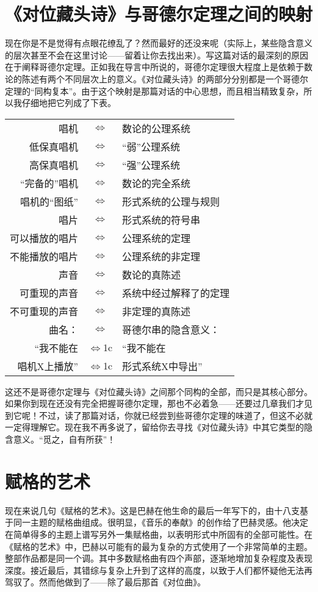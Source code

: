 \section{《对位藏头诗》与哥德尔定理之间的映射}

现在你是不是觉得有点眼花缭乱了？然而最好的还没来呢（实际上，某些隐含意义的层次甚至不会在这里讨论——留着让你去找出来）。写这篇对话的最深刻的原因在于阐释哥德尔定理。正如我在导言中所说的，哥德尔定理很大程度上是依赖于数论的陈述有两个不同层次上的意义。《对位藏头诗》的两部分分别都是一个哥德尔定理的“同构复本”。由于这个映射是那篇对话的中心思想，而且相当精致复杂，所以我仔细地把它列成了下表。

\begin{longtable}[c]{r>{$\iff$}cl}
唱机                & & 数论的公理系统 \\
低保真唱机      & & “弱”公理系统 \\
高保真唱机      & & “强”公理系统 \\
“完备的”唱机  & & 数论的完全系统 \\
唱机的“图纸” & & 形式系统的公理与规则 \\
唱片                 & & 形式系统的符号串 \\
可以播放的唱片 & & 公理系统的定理 \\
不能播放的唱片 & & 公理系统的非定理 \\
声音                 & & 数论的真陈述 \\
可重现的声音    & & 系统中经过解释了的定理 \\
不可重现的声音 & & 非定理的真陈述 \\
曲名：             & & 哥德尔串的隐含意义： \\
“我不能在       &\multicolumn1c{} & “我不能在 \\
唱机X上播放” &\multicolumn1c{} & 形式系统X中导出”
\end{longtable}

这还不是哥德尔定理与《对位藏头诗》之间那个同构的全部，而只是其核心部分。如果你到现在还没有完全把握哥德尔定理，那也不必着急——还要过几章我们才见到它呢！不过，读了那篇对话，你就已经尝到些哥德尔定理的味道了，但这不必就一定得理解它。现在我不再多说了，留给你去寻找《对位藏头诗》中其它类型的隐含意义。“觅之，自有所获”！

\section{赋格的艺术}

现在来说几句《赋格的艺术》。这是巴赫在他生命的最后一年写下的，由十八支基于同一主题的赋格曲组成。很明显，《音乐的奉献》的创作给了巴赫灵感。他决定在简单得多的主题上谱写另外一集赋格曲，以表明形式中所固有的全部可能性。在《赋格的艺术》中，巴赫以可能有的最为复杂的方式使用了一个非常简单的主题。整部作品都是同一个调。其中多数赋格曲有四个声部，逐渐地增加复杂程度及表现深度。接近最后，其错综与复杂上升到了这样的高度，以致于人们都怀疑他无法再驾驭了。然而他做到了——除了最后那首《对位曲》。

